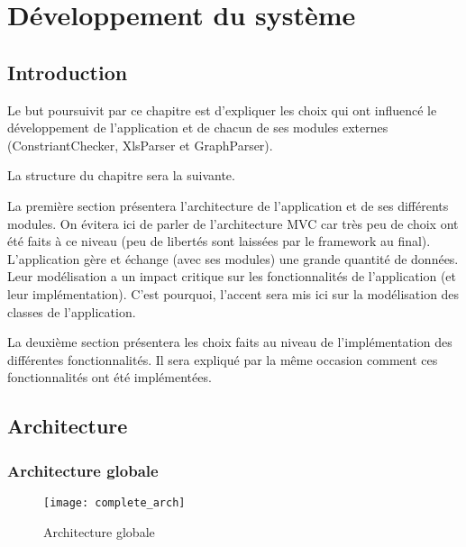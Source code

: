 \chapter{Développement du système}
\section{Introduction}
Le but poursuivit par ce chapitre est d'expliquer les choix qui ont influencé le développement de l'application et de chacun de ses modules externes (ConstriantChecker, XlsParser et GraphParser).

La structure du chapitre sera la suivante. 

La première section présentera l'architecture de l'application et de ses différents modules. On évitera ici de parler de l'architecture MVC car très peu de choix ont été faits à ce niveau  (peu de libertés sont laissées par le framework au final). L'application gère et échange (avec ses modules) une grande quantité de données. Leur modélisation a un impact critique sur les fonctionnalités de l'application (et leur implémentation). C'est pourquoi, l'accent sera mis ici sur la modélisation des classes de l'application.   

La deuxième section présentera les choix faits au niveau de l'implémentation des différentes fonctionnalités. Il sera expliqué par la même occasion comment ces fonctionnalités ont été implémentées. 


\label{developpement_system}
\section{Architecture}

\subsection{Architecture globale}

\begin{figure}
\caption{Architecture globale}
\centering
\label{fig:complete_arch}
\texttt{[image: complete\_arch]}
\end{figure}

